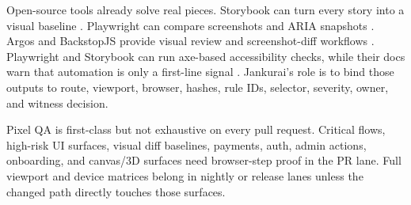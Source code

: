 Open-source tools already solve real pieces. Storybook can turn every story into a visual baseline \cite{storybookVisualTests2026}. Playwright can compare screenshots and ARIA snapshots \cite{playwrightVisualComparisons2026,playwrightAriaSnapshots2026}. Argos and BackstopJS provide visual review and screenshot-diff workflows \cite{argosVisualTesting2026,backstopJs2026}. Playwright and Storybook can run axe-based accessibility checks, while their docs warn that automation is only a first-line signal \cite{playwrightAccessibility2026,storybookAccessibility2026}. Jankurai's role is to bind those outputs to route, viewport, browser, hashes, rule IDs, selector, severity, owner, and witness decision.

Pixel QA is first-class but not exhaustive on every pull request. Critical flows, high-risk UI surfaces, visual diff baselines, payments, auth, admin actions, onboarding, and canvas/3D surfaces need browser-step proof in the PR lane. Full viewport and device matrices belong in nightly or release lanes unless the changed path directly touches those surfaces.
